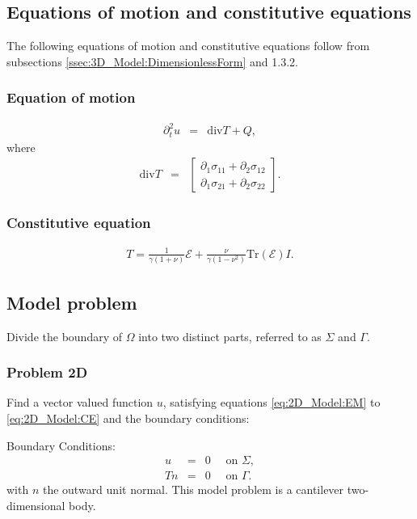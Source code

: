 \subsection*{Equations of motion and constitutive equations}\label{ssec:2D_Model:EquationsOfMotion+ConstitutiveEquations}
 The following equations of motion and constitutive equations follow from subsections \ref{ssec:3D_Model:DimensionlessForm} and 1.3.2.
\subsubsection{Equation of motion}\label{sssec:2D_Model:EquationOfMotion}
\begin{eqnarray}
	\partial_t^2 u & = & \textrm{div}T + Q, \label{eq:2D_Model:EM}
\end{eqnarray}
where
\begin{eqnarray}
	\textrm{div} T & = &
	\begin{bmatrix}
		\partial_1 \sigma_{11} + \partial_2 \sigma_{12} \\
		\partial_1 \sigma_{21} + \partial_2 \sigma_{22}
	\end{bmatrix}. \label{eq:2D_Model:DivT}
\end{eqnarray}
\subsubsection*{Constitutive equation}\label{sssec:2D_Model:ConstitutiveEquation}
\begin{eqnarray}
	T = \frac{1}{\gamma(1+\nu)}\mathcal{E} + \frac{\nu}{\gamma(1-\nu^2)}\textrm{Tr}(\mathcal{E}) I. \label{eq:2D_Model:CE}
\end{eqnarray}

\subsection{Model problem}\label{ssec:2D_Model:ModelProblem}
Divide the boundary of $\Omega$ into two distinct parts, referred to as $\Sigma$ and $\Gamma$.

\subsubsection*{Problem 2D}\label{sssec:2D_Model:Problem2D1}
Find a vector valued function $u$, satisfying equations \eqref{eq:2D_Model:EM} to \eqref{eq:2D_Model:CE} and the boundary conditions:

Boundary Conditions:
\begin{eqnarray*}
	u & = & 0 \quad \textrm{ on } \Sigma,\\
	Tn & = & 0 \quad \textrm{ on } \Gamma.
\end{eqnarray*} with $n$ the outward unit normal. This model problem is a cantilever two-dimensional body.

